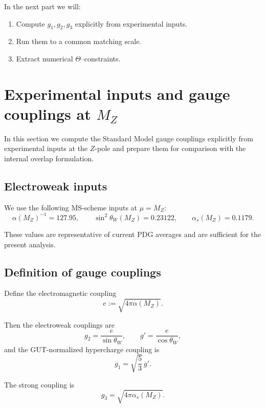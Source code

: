 \documentclass[11pt]{article}
\begin{document}
In the next part we will:
\begin{enumerate}
\item Compute $g_1,g_2,g_3$ explicitly from experimental inputs.
\item Run them to a common matching scale.
\item Extract numerical $\Theta$–constraints.
\end{enumerate}
\section{Experimental inputs and gauge couplings at $M_Z$}

In this section we compute the Standard Model gauge couplings explicitly
from experimental inputs at the $Z$-pole and prepare them for comparison
with the internal overlap formulation.

\subsection{Electroweak inputs}

We use the following $\overline{\mathrm{MS}}$-scheme inputs at $\mu=M_Z$:
\begin{equation}
\alpha(M_Z)^{-1} = 127.95,
\qquad
\sin^2\theta_W(M_Z) = 0.23122,
\qquad
\alpha_s(M_Z) = 0.1179.
\label{eq:EWinputs}
\end{equation}

These values are representative of current PDG averages and are sufficient
for the present analysis.

\subsection{Definition of gauge couplings}

Define the electromagnetic coupling
\begin{equation}
e := \sqrt{4\pi \alpha(M_Z)}.
\end{equation}

Then the electroweak couplings are
\begin{equation}
g_2 = \frac{e}{\sin\theta_W},
\qquad
g' = \frac{e}{\cos\theta_W},
\end{equation}
and the GUT-normalized hypercharge coupling is
\begin{equation}
g_1 = \sqrt{\frac{5}{3}}\, g'.
\end{equation}

The strong coupling is
\begin{equation}
g_3 = \sqrt{4\pi \alpha_s(M_Z)}.
\end{equation}
\end{document}
